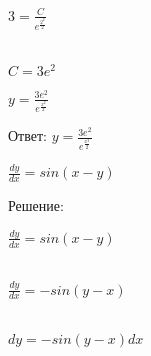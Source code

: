 \documentclass{article}
\begin{document}
\begin{center}
\end{center}

\begin{flushleft}
    $3 = \frac{C}{e^{\frac{2^2}{2}}}$\\\\
\end{flushleft}

\begin{center}
\end{center}

\begin{flushleft}
    $C = 3e^2$
\end{flushleft}

\begin{center}
\end{center}

\begin{flushleft}
    $y = \frac{3e^2}{e^{\frac{x^2}{2}}}$
\end{flushleft}

\begin{center}
    Ответ: $y = \frac{3e^2}{e^{\frac{x^2}{2}}}$
\end{center}

\begin{center}
\end{center}

\begin{center}
    $\frac{dy}{dx} = sin(x-y)$
\end{center}

\begin{center}
    Решение:
\end{center}

\begin{flushleft}
    $\frac{dy}{dx} = sin(x-y)$\\\\
\end{flushleft}

\begin{flushleft}
    $\frac{dy}{dx} = -sin(y - x)$\\\\
\end{flushleft}

\begin{flushleft}
    $dy = -sin(y - x)dx$\\\\
\end{flushleft}
\end{document}
